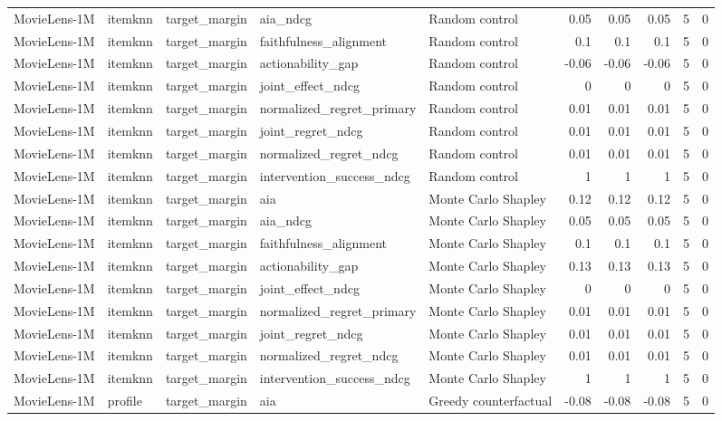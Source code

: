 \begin{table}[t]
{\begin{tabular}{lllllrrrrr}
MovieLens-1M & itemknn & target\_margin & aia\_ndcg & Random control & 0.05 & 0.05 & 0.05 & 5 & 0 \\
MovieLens-1M & itemknn & target\_margin & faithfulness\_alignment & Random control & 0.1 & 0.1 & 0.1 & 5 & 0 \\
MovieLens-1M & itemknn & target\_margin & actionability\_gap & Random control & -0.06 & -0.06 & -0.06 & 5 & 0 \\
MovieLens-1M & itemknn & target\_margin & joint\_effect\_ndcg & Random control & 0 & 0 & 0 & 5 & 0 \\
MovieLens-1M & itemknn & target\_margin & normalized\_regret\_primary & Random control & 0.01 & 0.01 & 0.01 & 5 & 0 \\
MovieLens-1M & itemknn & target\_margin & joint\_regret\_ndcg & Random control & 0.01 & 0.01 & 0.01 & 5 & 0 \\
MovieLens-1M & itemknn & target\_margin & normalized\_regret\_ndcg & Random control & 0.01 & 0.01 & 0.01 & 5 & 0 \\
MovieLens-1M & itemknn & target\_margin & intervention\_success\_ndcg & Random control & 1 & 1 & 1 & 5 & 0 \\
MovieLens-1M & itemknn & target\_margin & aia & Monte Carlo Shapley & 0.12 & 0.12 & 0.12 & 5 & 0 \\
MovieLens-1M & itemknn & target\_margin & aia\_ndcg & Monte Carlo Shapley & 0.05 & 0.05 & 0.05 & 5 & 0 \\
MovieLens-1M & itemknn & target\_margin & faithfulness\_alignment & Monte Carlo Shapley & 0.1 & 0.1 & 0.1 & 5 & 0 \\
MovieLens-1M & itemknn & target\_margin & actionability\_gap & Monte Carlo Shapley & 0.13 & 0.13 & 0.13 & 5 & 0 \\
MovieLens-1M & itemknn & target\_margin & joint\_effect\_ndcg & Monte Carlo Shapley & 0 & 0 & 0 & 5 & 0 \\
MovieLens-1M & itemknn & target\_margin & normalized\_regret\_primary & Monte Carlo Shapley & 0.01 & 0.01 & 0.01 & 5 & 0 \\
MovieLens-1M & itemknn & target\_margin & joint\_regret\_ndcg & Monte Carlo Shapley & 0.01 & 0.01 & 0.01 & 5 & 0 \\
MovieLens-1M & itemknn & target\_margin & normalized\_regret\_ndcg & Monte Carlo Shapley & 0.01 & 0.01 & 0.01 & 5 & 0 \\
MovieLens-1M & itemknn & target\_margin & intervention\_success\_ndcg & Monte Carlo Shapley & 1 & 1 & 1 & 5 & 0 \\
MovieLens-1M & profile & target\_margin & aia & Greedy counterfactual & -0.08 & -0.08 & -0.08 & 5 & 0 \\

\end{tabular}}
\end{table}

